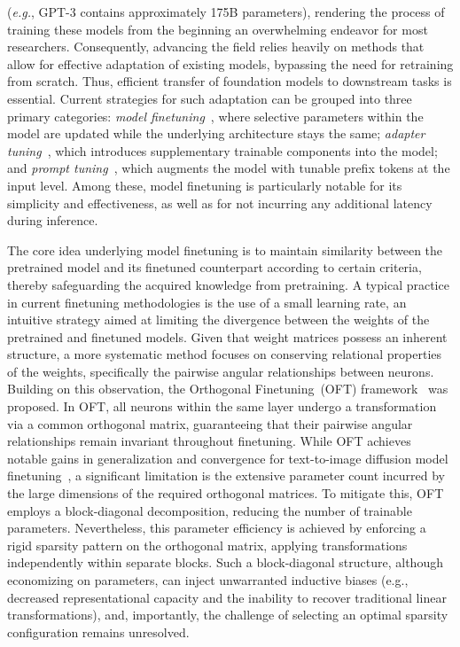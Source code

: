 (\emph{e.g.}, GPT-3 contains approximately 175B parameters), rendering the process of training these models from the beginning an overwhelming endeavor for most researchers. Consequently, advancing the field relies heavily on methods that allow for effective adaptation of existing models, bypassing the need for retraining from scratch. Thus, efficient transfer of foundation models to downstream tasks is essential. Current strategies for such adaptation can be grouped into three primary categories: \emph{model finetuning}~\cite{hulora2022,zaken2022bitfit,guo2020parameter,raffel2020exploring,qiu2023controlling,zhang2022adaptive,chavan2023one}, where selective parameters within the model are updated while the underlying architecture stays the same; \emph{adapter tuning}~\cite{rebuffi2017learning,houlsby2019parameter,pfeiffer2020adapterfusion,lin2020exploring,he2021towards}, which introduces supplementary trainable components into the model; and \emph{prompt tuning}~\cite{li2021prefix,lester2021power}, which augments the model with tunable prefix tokens at the input level. Among these, model finetuning is particularly notable for its simplicity and effectiveness, as well as for not incurring any additional latency during inference.

The core idea underlying model finetuning is to maintain similarity between the pretrained model and its finetuned counterpart according to certain criteria, thereby safeguarding the acquired knowledge from pretraining. A typical practice in current finetuning methodologies is the use of a small learning rate, an intuitive strategy aimed at limiting the divergence between the weights of the pretrained and finetuned models. Given that weight matrices possess an inherent structure, a more systematic method focuses on conserving relational properties of the weights, specifically the pairwise angular relationships between neurons. Building on this observation, the Orthogonal Finetuning~(OFT) framework~\cite{qiu2023controlling} was proposed. In OFT, all neurons within the same layer undergo a transformation via a common orthogonal matrix, guaranteeing that their pairwise angular relationships remain invariant throughout finetuning. While OFT achieves notable gains in generalization and convergence for text-to-image diffusion model finetuning~\cite{qiu2023controlling}, a significant limitation is the extensive parameter count incurred by the large dimensions of the required orthogonal matrices. To mitigate this, OFT employs a block-diagonal decomposition, reducing the number of trainable parameters. Nevertheless, this parameter efficiency is achieved by enforcing a rigid sparsity pattern on the orthogonal matrix, applying transformations independently within separate blocks. Such a block-diagonal structure, although economizing on parameters, can inject unwarranted inductive biases (e.g., decreased representational capacity and the inability to recover traditional linear transformations), and, importantly, the challenge of selecting an optimal sparsity configuration remains unresolved.

